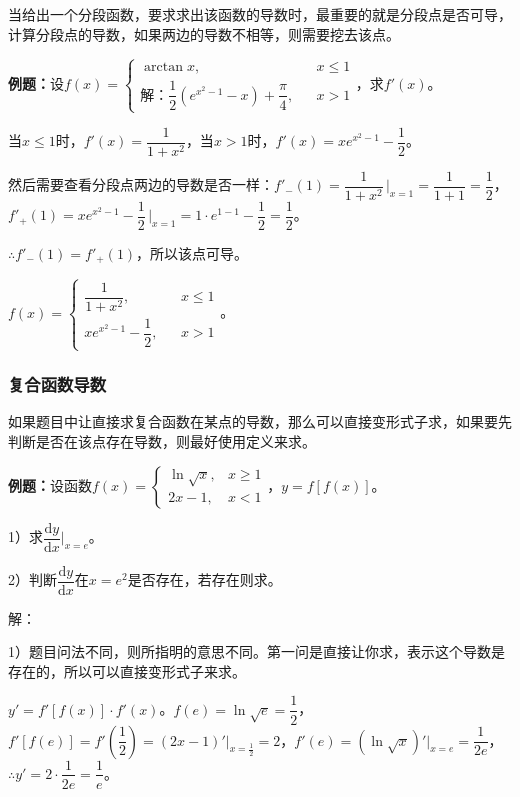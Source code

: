 \documentclass[UTF8, 12pt]{ctexart}
\begin{document}
当给出一个分段函数，要求求出该函数的导数时，最重要的就是分段点是否可导，计算分段点的导数，如果两边的导数不相等，则需要挖去该点。\medskip

\textbf{例题：}设$f(x)=\left\{\begin{array}{lcl}
    \arctan x, & & x\leqslant 1 \\
解：    \dfrac{1}{2}(e^{x^2-1}-x)+\dfrac{\pi}{4}, & & x>1
\end{array}
\right.$，求$f'(x)$。

当$x\leqslant 1$时，$f'(x)=\dfrac{1}{1+x^2}$，当$x>1$时，$f'(x)=xe^{x^2-1}-\dfrac{1}{2}$。

然后需要查看分段点两边的导数是否一样：$f'_-(1)=\dfrac{1}{1+x^2}\,\bigg\vert_{x=1}=\dfrac{1}{1+1}=\dfrac{1}{2}$，$f'_+(1)=xe^{x^2-1}-\dfrac{1}{2}\,\bigg\vert_{x=1}=1\cdot e^{1-1}-\dfrac{1}{2}=\dfrac{1}{2}$。\medskip

$\therefore f'_-(1)=f'_+(1)$，所以该点可导。\medskip

$f(x)=\left\{\begin{array}{lcl}
    \dfrac{1}{1+x^2}, & & x\leqslant 1 \\
    xe^{x^2-1}-\dfrac{1}{2}, & & x>1
\end{array}
\right.$。

\subsubsection{复合函数导数}

如果题目中让直接求复合函数在某点的导数，那么可以直接变形式子求，如果要先判断是否在该点存在导数，则最好使用定义来求。\medskip

\textbf{例题：}设函数$f(x)=\left\{\begin{array}{ll}
    \ln\sqrt{x}, & x\geqslant1\\
    2x-1, &x<1
\end{array}\right.$，$y=f[f(x)]$。

1）求$\dfrac{\textrm{d}y}{\textrm{d}x}\bigg\vert_{x=e}$。

2）判断$\dfrac{\textrm{d}y}{\textrm{d}x}$在$x=e^2$是否存在，若存在则求。

解：

1）题目问法不同，则所指明的意思不同。第一问是直接让你求，表示这个导数是存在的，所以可以直接变形式子来求。

$y'=f'[f(x)]\cdot f'(x)$。$f(e)=\ln\sqrt{e}=\dfrac{1}{2}$，$f'[f(e)]=f'\left(\dfrac{1}{2}\right)=(2x-1)'\vert_{x=\frac{1}{2}}=2$，$f'(e)=(\ln\sqrt{x})'\vert_{x=e}=\dfrac{1}{2e}$，$\therefore y'=2\cdot\dfrac{1}{2e}=\dfrac{1}{e}$。
\end{document}

